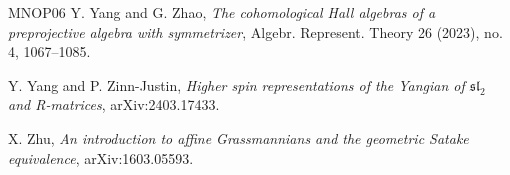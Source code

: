 \documentclass[10pt]{amsart}
\theoremstyle{definition}
\numberwithin{equation}{section}
\begin{document}
\begin{thebibliography}{MNOP06}
 Y. Yang and G. Zhao, \textit{The cohomological Hall algebras of a preprojective algebra with symmetrizer}, Algebr. Represent. Theory 26 (2023), no. 4, 1067--1085.

Y. Yang and P. Zinn-Justin, \textit{Higher spin representations of the Yangian of $\mathfrak{sl}_2$ and R-matrices}, arXiv:2403.17433.

X. Zhu, \textit{An introduction to affine Grassmannians and the geometric Satake equivalence}, arXiv:1603.05593.


\end{thebibliography}
\end{document}
